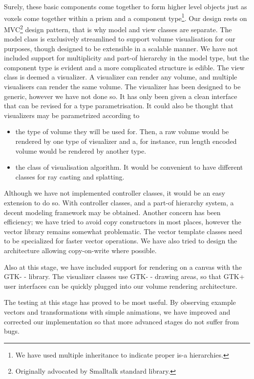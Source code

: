 \documentclass[a4paper,12pt]{article}
\begin{document}
 Surely, these basic components come together to form higher level
 objects just as voxels come together within a prism and a component
 type\footnote{We have used multiple inheritance to indicate proper
 is-a hierarchies.}. Our design rests on MVC\footnote{Originally
 advocated by Smalltalk standard library.} design pattern, that is
 why model and view classes are separate. The model class is
 exclusively streamlined to support volume visualisation for our
 purposes, though designed to be extensible in a scalable manner. We
 have not included support for multiplicity and part-of hierarchy in
 the model type, but the component type is evident and a more
 complicated structure is edible. The view class is deemed a
 visualizer. A visualizer can render any volume, and multiple
 visualisers can render the same volume. The visualizer has been
 designed to be generic, however we have not done so. It has only been
 given a clean interface that can be revised for a type
 parametrisation. It could also be thought that visualizers may be
 parametrized according to
 \begin{itemize}
 \item the type of volume they will be used for. Then, a raw volume would
   be rendered by one type of visualizer and a, for instance, run
   length encoded volume would be rendered by another type.
 \item the class of visualisation algorithm. It would be convenient to
   have different classes for ray casting and splatting.
 \end{itemize}
 Although we have not implemented controller classes, it would be an
 easy extension to do so. With controller classes, and a part-of
 hierarchy system, a decent modeling framework may be
 obtained. Another concern has been efficiency; we have tried to avoid
 copy constructors in most places, however the vector library remains
 somewhat problematic. The vector template classes need to be
 specialized for faster vector operations. We have also tried to design
 the architecture allowing copy-on-write where possible.

 Also at this stage, we have included support for rendering on a
 canvas with the GTK- - library. The visualizer classes use GTK- -
 drawing areas, so that GTK+ user interfaces can be quickly plugged
 into our volume rendering architecture.

 The testing at this stage has proved to be most useful. By observing
 example vectors and transformations with simple animations,
 we have improved and corrected our implementation so that more
 advanced stages do not suffer from bugs.
\end{document}

